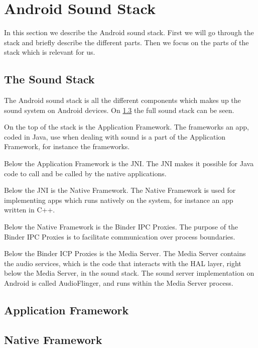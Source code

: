 \section{Android Sound Stack}
In this section we describe the Android sound stack.
First we will go through the stack and briefly describe the different parts. 
Then we focus on the parts of the stack which is relevant for us.

\subsection{The Sound Stack}
The Android sound stack is all the different components which makes up the sound system on Android devices.
On \cref{} the full sound stack can be seen.

On the top of the stack is the Application Framework.
The frameworks an app, coded in Java, use when dealing with sound is a part of the Application Framework,
for instance the  frameworks.

Below the Application Framework is the \ac{JNI}.
The \ac{JNI} makes it possible for Java code to call and be called by the native applications\cite{jni}.

Below the \ac{JNI} is the Native Framework.
The Native Framework is used for implementing apps which runs natively on the system,
for instance an app written in C++. 

Below the Native Framework is the Binder IPC Proxies.
The purpose of the Binder IPC Proxies is to facilitate communication over process boundaries.

Below the Binder ICP Proxies is the Media Server.
The Media Server contains the audio services, which is the code that interacts with the \ac{HAL} layer,
right below the Media Server, in the sound stack.
The sound server implementation on Android is called AudioFlinger, and runs within the Media Server process\cite{audioflinger}.




\subsection{Application Framework}
\subsection{Native Framework}

